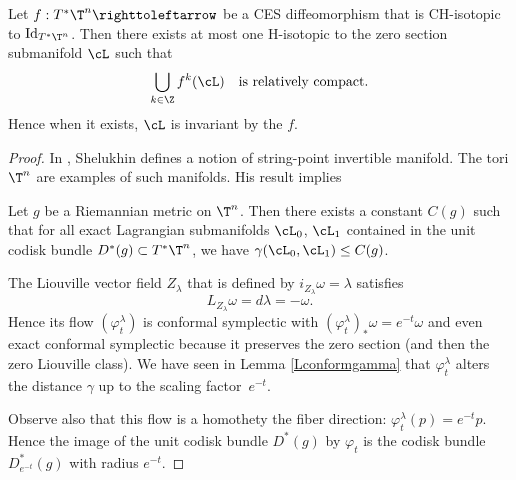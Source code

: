 
\begin{theorem}
Let $f:T^*\T^n \righttoleftarrow$ be a CES diffeomorphism that is CH-isotopic to ${\rm Id}_{T^*\T^n}$. Then there exists at most one H-isotopic to the zero section submanifold $\cL$ such that
\[
\bigcup_{k\in\Z}f^k(\cL)\quad\text{is relatively compact}.
\]
Hence when it exists, $\cL$ is invariant by the $f$.
\end{theorem}

\begin{proof}
In \cite{Shel2020}, Shelukhin defines a notion of string-point invertible manifold. The tori $\T^n$ are examples of such manifolds. His result implies
\begin{theorem*} Let $g$ be a Riemannian metric
on $\T^n$. Then there exists a constant $C(g)$ such that for all exact Lagrangian submanifolds
$\cL_0$, $\cL_1$ contained in the unit codisk bundle $D^*(g)\subset T^*\T^n$, we have
$\gamma (\cL_0, \cL_1) \leq C(g)$.
\end{theorem*}

The Liouville vector field $Z_\lambda$ that is defined by $i_{Z_\lambda}\omega=\lambda$ satisfies
\[
L_{Z_\lambda}\omega=d\lambda=-\omega.
\]
Hence its flow $(\varphi^\lambda_t)$ is conformal symplectic with $(\varphi^\lambda_{t})_*\omega=e^{-t}\omega$ and even exact conformal symplectic because it preserves the zero section (and then the zero Liouville class). We have seen in Lemma \ref{Lconformgamma} that $\varphi^\lambda_t$ alters the distance $\gamma$ up to the scaling factor~$e^{-t}$.

Observe also that this flow is a homothety the fiber direction: $\varphi^\lambda_t(p)=e^{-t}p$. Hence the image of the unit codisk bundle $D^*(g)$ by $\varphi_t$ is the codisk bundle $D_{e^{-t}}^*(g)$ with radius $e^{-t}$.


\end{proof}
